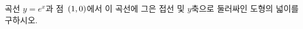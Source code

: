 \hspace*{2mm}\begin{minipage}[t]{\dimexpr\linewidth-2mm\relax}\vspace{0pt}
곡선 $y=e^x$과 점~$(1{,}\mkern3mu\mathopen{}0)$에서 이 곡선에 그은 접선 및 $y$축으로 둘러싸인 도형의 넓이를 구하시오.\end{minipage}
